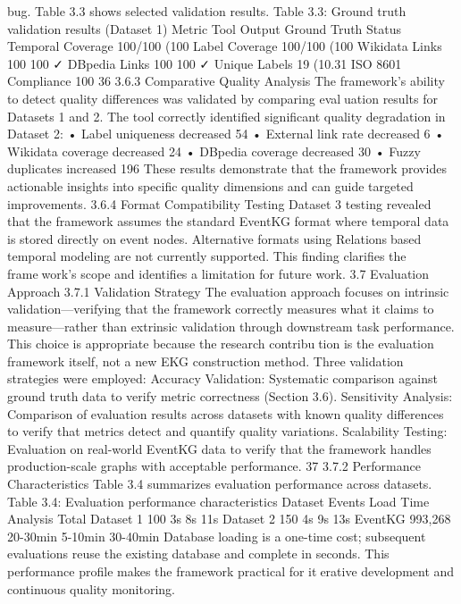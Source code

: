 bug. Table 3.3 shows selected validation results.
Table 3.3: Ground truth validation results (Dataset 1)
Metric Tool Output Ground Truth Status
Temporal Coverage 100/100 (100%
Label Coverage 100/100 (100%
Wikidata Links 100 100 ✓
DBpedia Links 100 100 ✓
Unique Labels 19 (10.31%
ISO 8601 Compliance 100%
36
3.6.3 Comparative Quality Analysis
The framework’s ability to detect quality differences was validated by comparing evaluation results for Datasets 1 and 2. The tool correctly identified significant quality
degradation in Dataset 2:
• Label uniqueness decreased 54%
• External link rate decreased 6%
• Wikidata coverage decreased 24%
• DBpedia coverage decreased 30%
• Fuzzy duplicates increased 196%
These results demonstrate that the framework provides actionable insights into specific
quality dimensions and can guide targeted improvements.
3.6.4 Format Compatibility Testing
Dataset 3 testing revealed that the framework assumes the standard EventKG format
where temporal data is stored directly on event nodes. Alternative formats using Relationsbased temporal modeling are not currently supported. This finding clarifies the framework’s scope and identifies a limitation for future work.
3.7 Evaluation Approach
3.7.1 Validation Strategy
The evaluation approach focuses on intrinsic validation—verifying that the framework
correctly measures what it claims to measure—rather than extrinsic validation through
downstream task performance. This choice is appropriate because the research contribution is the evaluation framework itself, not a new EKG construction method.
Three validation strategies were employed:
Accuracy Validation: Systematic comparison against ground truth data to verify
metric correctness (Section 3.6).
Sensitivity Analysis: Comparison of evaluation results across datasets with known
quality differences to verify that metrics detect and quantify quality variations.
Scalability Testing: Evaluation on real-world EventKG data to verify that the
framework handles production-scale graphs with acceptable performance.
37
3.7.2 Performance Characteristics
Table 3.4 summarizes evaluation performance across datasets.
Table 3.4: Evaluation performance characteristics
Dataset Events Load Time Analysis Total
Dataset 1 100 3s 8s 11s
Dataset 2 150 4s 9s 13s
EventKG 993,268 20-30min 5-10min 30-40min
Database loading is a one-time cost; subsequent evaluations reuse the existing database
and complete in seconds. This performance profile makes the framework practical for iterative development and continuous quality monitoring.
